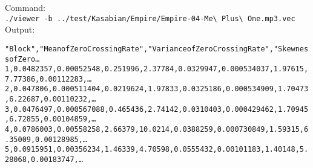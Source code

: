 Command:\\
\verb"./viewer -b ../test/Kasabian/Empire/Empire-04-Me\ Plus\ One.mp3.vec"\\
Output:
\begin{alltt}
"Block","Mean of Zero Crossing Rate","Variance of Zero Crossing Rate","Skewness of Zero\ldots
1,0.0482357,0.00052548,0.251996,2.37784,0.0329947,0.000534037,1.97615,7.77386,0.00112283,\ldots
2,0.047806,0.000511404,0.0219624,1.97833,0.0325186,0.000534909,1.70473,6.22687,0.00110232,\ldots
3,0.0476497,0.000567088,0.465436,2.74142,0.0310403,0.000429462,1.70945,6.72855,0.00104859,\ldots
4,0.0786003,0.00558258,2.66379,10.0214,0.0388259,0.000730849,1.59315,6.35009,0.00128985,\ldots
5,0.0915951,0.00356234,1.46339,4.70598,0.0555432,0.00101183,1.40148,5.28068,0.00183747,\ldots
\end{alltt}

